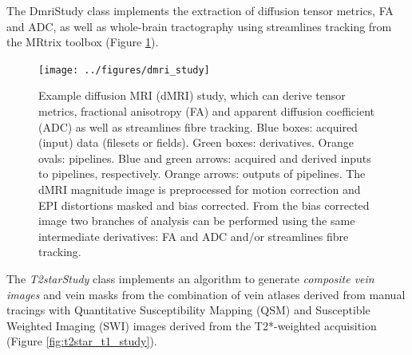 \documentclass[smallextended]{svjour3}       %
\begin{document}
The DmriStudy class implements the extraction of diffusion tensor metrics,
FA and ADC, as well as whole-brain tractography using streamlines tracking from the MRtrix
toolbox \citep{tournier_improved_2010,tournier_mrtrix:_2012} (Figure \ref{fig:dmri_study}).

\begin{figure}
	\centering
    \texttt{[image: ../figures/dmri\_study]}
  \caption{Example diffusion MRI (dMRI) study, which can derive
tensor metrics, fractional anisotropy (FA) and apparent diffusion
coefficient (ADC) as well as streamlines fibre tracking. Blue boxes:
acquired (input) data (filesets or fields). Green boxes: derivatives.
Orange ovals: pipelines. Blue and green arrows: acquired and derived
inputs to pipelines, respectively. Orange arrows: outputs of pipelines.
The dMRI magnitude image is preprocessed for motion correction and EPI
distortions masked and bias corrected. From the bias corrected image two
branches of analysis can be performed using the same intermediate
derivatives: FA and ADC and/or streamlines fibre tracking.}
\label{fig:dmri_study}
\end{figure}

The \emph{T2starStudy} class implements an algorithm to generate
\emph{composite vein images} \citep{ward_combining_2018} and
vein masks \citep{ward_vein_2017} from the combination of
vein atlases derived from manual tracings with Quantitative
Susceptibility Mapping (QSM) and Susceptible Weighted Imaging (SWI)
images derived from the T2*-weighted acquisition (Figure \ref{fig:t2star_t1_study}).
\end{document}
